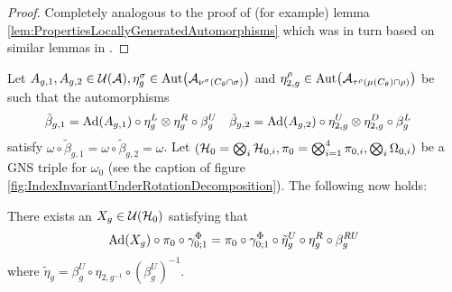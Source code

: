 \documentclass[11pt,a4paper,twoside]{article}
\numberwithin{equation}{section}
\begin{document}
	\begin{proof}
		Completely analogous to the proof of (for example) lemma \ref{lem:PropertiesLocallyGeneratedAutomorphisms} which was in turn based on similar lemmas in \cite{ogata2021h3gmathbb}.
	\end{proof}
	Let $A_{g,1},A_{g,2}\in\UU(\AA),\eta^\sigma_g\in\Aut{\AA_{\nu^{\sigma}(C_\theta\cap\sigma)}}$ and $\eta^\rho_{2,g}\in\Aut{\AA_{\tau^{\rho}(\mu(C_\theta)\cap\rho)}}$ be such that the automorphisms
	\begin{align}
		\tilde{\beta}_{g,1}&=\Ad{A_{g,1}}\circ\eta_g^L\otimes\eta_g^R\circ\beta_g^U&\tilde{\beta}_{g,2}&=\Ad{A_{g,2}}\circ\eta_{2,g}^U\otimes\eta_{2,g}^D\circ\beta_g^L
	\end{align}
	satisfy $\omega\circ\tilde{\beta}_{g,1}=\omega\circ\tilde{\beta}_{g,2}=\omega$. Let $(\mathcal H_0=\bigotimes_i\mathcal H_{0,i},\pi_0=\bigotimes_{i=1}^4\pi_{0,i},\bigotimes_i\Omega_{0,i})$ be a GNS triple for $\omega_0$ (see the caption of figure \ref{fig:IndexInvariantUnderRotationDecomposition}). The following now holds:
	\begin{lemma}\label{lem:DefinitionX_gLemma}
		There exists an $X_g\in\mathcal U(\mathcal H_0)$ satisfying that
		\begin{equation}\label{eq:DefinitionX_gLemma}
			\Ad{X_g}\circ\pi_0\circ\gamma^\Phi_{0;1}=\pi_0\circ\gamma^\Phi_{0;1}\circ\tilde{\eta}^U_g\circ\eta^R_g\circ\beta_g^{RU}
		\end{equation}
		where $\tilde{\eta}_g=\beta_g^U\circ\eta_{2,g^{-1}}\circ(\beta_g^U)^{-1}$.
	\end{lemma}
\end{document}

